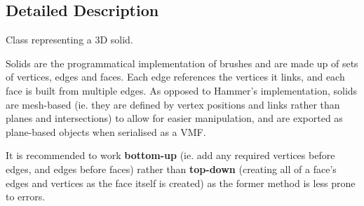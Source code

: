 \subsection{Detailed Description}
Class representing a 3\-D solid. 

Solids are the programmatical implementation of brushes and are made up of sets of vertices, edges and faces. Each edge references the vertices it links, and each face is built from multiple edges. As opposed to Hammer's implementation, solids are mesh-\/based (ie. they are defined by vertex positions and links rather than planes and intersections) to allow for easier manipulation, and are exported as plane-\/based objects when serialised as a V\-M\-F.\par
 It is recommended to work {\bfseries bottom-\/up} (ie. add any required vertices before edges, and edges before faces) rather than {\bfseries top-\/down} (creating all of a face's edges and vertices as the face itself is created) as the former method is less prone to errors. 

